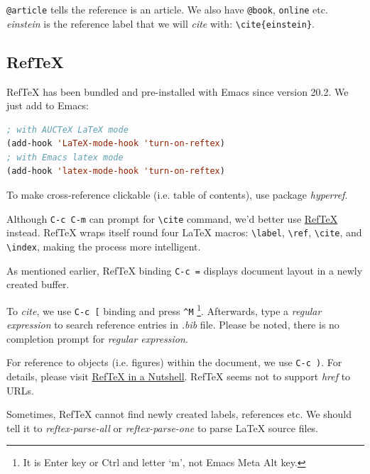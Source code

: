 \verb|@article| tells the reference is an article. We also have
\verb|@book|, \verb|online| etc. \textit{einstein} is the
reference label that we will \textit{cite} with: \verb|\cite{einstein}|.

\subsection{RefTeX}
\label{sec:reftex}

RefTeX has been bundled and pre-installed with Emacs since version
20.2. We just add to Emacs:
\begin{lstlisting}[language=Lisp,caption={Enable RefTeX}]
; with AUCTeX LaTeX mode
(add-hook 'LaTeX-mode-hook 'turn-on-reftex)
; with Emacs latex mode
(add-hook 'latex-mode-hook 'turn-on-reftex)
\end{lstlisting}

To make cross-reference clickable (i.e. table of contents), use
package \textit{hyperref}.

Although \verb|C-c C-m| can prompt for \verb|\cite| command, we'd
better use
\href{https://www.gnu.org/software/auctex/manual/reftex.html}{RefTeX}
instead. RefTeX wraps itself round four LaTeX macros:
\verb|\label|, \verb|\ref|, \verb|\cite|, and \verb|\index|,
making the process more intelligent.

As mentioned earlier, RefTeX binding \verb|C-c =| displays document layout
in a newly created buffer.

To \textit{cite}, we use \verb|C-c [| binding and press \verb|^M|
\footnote{It is Enter key or Ctrl and letter `m', not Emacs Meta Alt
key.}. Afterwards, type a \textit{regular expression} to search
reference entries in \textit{.bib} file. Please be noted, there is
no completion prompt for \textit{regular expression}.

For reference to objects (i.e. figures) within the document, we
use \verb|C-c )|. For details, please visit
\href{https://www.gnu.org/software/auctex/manual/reftex/RefTeX-in-a-Nutshell.html}{RefTeX
  in a Nutshell}. RefTeX seems not to support \textit{href} to
URLs.

Sometimes, RefTeX cannot find newly created labels, references
etc. We should tell it to \textit{reftex-parse-all} or
\textit{reftex-parse-one} to parse \LaTeX{} source files.

